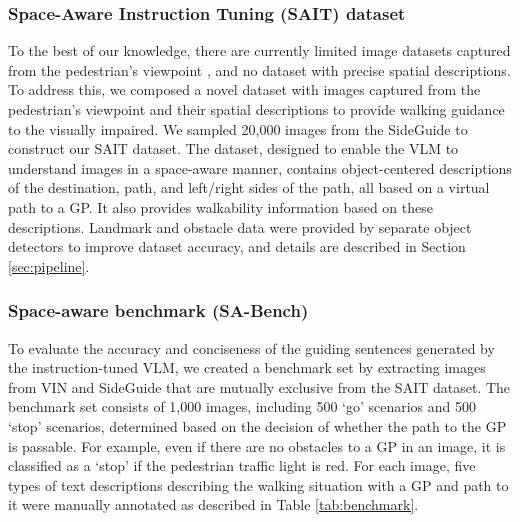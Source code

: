 \subsubsection{Space-Aware Instruction Tuning (SAIT) dataset}
To the best of our knowledge, there are currently limited image datasets captured from the pedestrian's viewpoint \cite{Kibaek2020}\cite{Karnan2022}\cite{Zhao2023}, and no dataset with precise spatial descriptions.
To address this, we composed a novel dataset with images captured from the pedestrian's viewpoint and their spatial descriptions to provide walking guidance to the visually impaired.
We sampled 20,000 images from the SideGuide to construct our SAIT dataset.
The dataset, designed to enable the VLM to understand images in a space-aware manner, contains object-centered descriptions of the destination, path, and left/right sides of the path, all based on a virtual path to a GP. 
It also provides walkability information based on these descriptions.
Landmark and obstacle data were provided by separate object detectors to improve dataset accuracy, and details are described in Section \ref{sec:pipeline}.

\subsubsection{Space-aware benchmark (SA-Bench)}
To evaluate the accuracy and conciseness of the guiding sentences generated by the instruction-tuned VLM, we created a benchmark set by extracting images from VIN and SideGuide that are mutually exclusive from the SAIT dataset.
The benchmark set consists of 1,000 images, including 500 `go' scenarios and 500 `stop' scenarios, determined based on the decision of whether the path to the GP is passable.
For example, even if there are no obstacles to a GP in an image, it is classified as a `stop' if the pedestrian traffic light is red.
For each image, five types of text descriptions describing the walking situation with a GP and path to it were manually annotated as described in Table \ref{tab:benchmark}.



